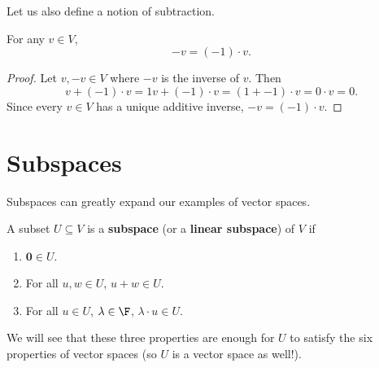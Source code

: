 \documentclass[math0540-lecture-notes.tex]{subfiles}
\begin{document}
Let us also define a notion of subtraction.
\begin{proposition}[-v]{}
  For any $v\in V$, \[
    -v = (-1)\cdot v
  .\] 
\end{proposition}
\begin{proof}[Proof]
  Let $v,-v\in V$ where $-v$ is the inverse of $v$. Then  \[
    v + (-1)\cdot v = 1v + (-1)\cdot v = (1+ -1)\cdot v = 0\cdot v=0
  .\] Since every $v\in V$ has a unique additive inverse, $-v=(-1)\cdot v$.
\end{proof}

\section{Subspaces}
Subspaces can greatly expand our examples of vector spaces.
\begin{definition}[Subspaces]{}
  A subset $U\subseteq V$ is a  \textbf{subspace} (or a \textbf{linear subspace}) of $V$ if
  \begin{enumerate}
    \item $\textbf{0} \in  U$.
    \item For all $u,w\in U$, $u+w\in U$.
    \item For all $u\in U$, $\lambda\in \F$, $ \lambda\cdot u\in U$.
  \end{enumerate}
  We will see that these three properties are enough for $U$ to satisfy the six properties of vector
  spaces (so $U$ is a vector space as well!).
\end{definition}
\end{document}

